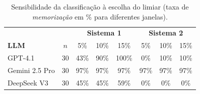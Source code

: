 \begin{table}[h]
\centering
\footnotesize
\caption{Sensibilidade da classificação à escolha do limiar (taxa de \emph{memorização} em \% para diferentes janelas).}
\label{tab:sm_threshold}
\begin{tabular}{l c ccc ccc}
\toprule
& & \multicolumn{3}{c}{\textbf{Sistema 1}} & \multicolumn{3}{c}{\textbf{Sistema 2}} \\
\textbf{LLM} & $n$ & 5\% & 10\% & 15\% & 5\% & 10\% & 15\% \\
\midrule
GPT-4.1 & 30 & 43\% & 90\% & 100\% & 0\% & 10\% & 10\% \\
Gemini 2.5 Pro & 30 & 97\% & 97\% & 97\% & 97\% & 97\% & 97\% \\
DeepSeek V3 & 30 & 45\% & 45\% & 59\% & 0\% & 0\% & 0\% \\
\bottomrule
\end{tabular}
\end{table}